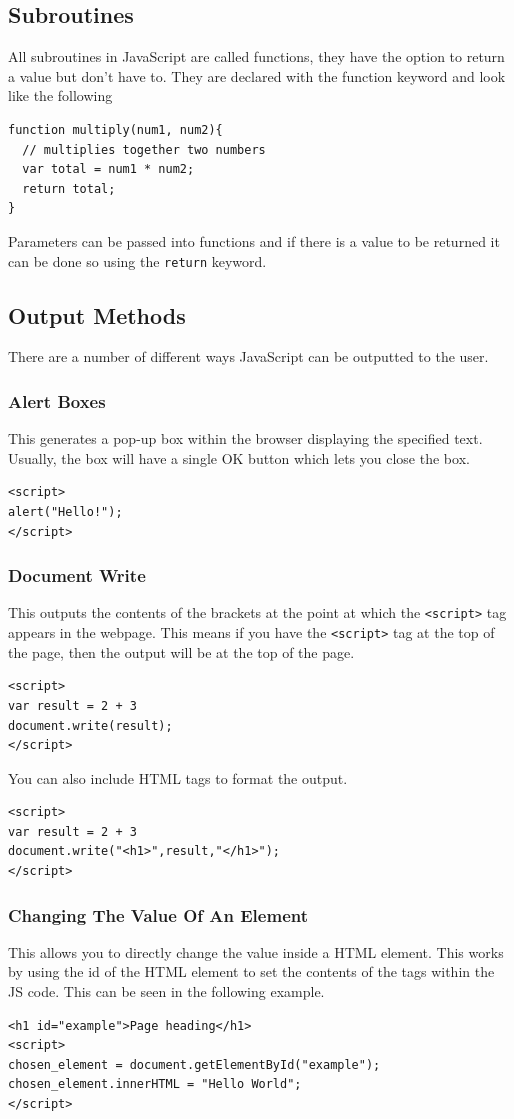 \documentclass{thomasClass}
\begin{document}
\subsection{Subroutines}
All subroutines in JavaScript are called functions, they have the option to return a value but don’t have to. 
They are declared with the function keyword and look like the following
\begin{Verbatim}[breaklines=true, breakanywhere=true]
function multiply(num1, num2){
  // multiplies together two numbers
  var total = num1 * num2;
  return total;
}
\end{Verbatim}
Parameters can be passed into functions and if there is a value to be returned it can be done so using the \verb|return| keyword.
\subsection{Output Methods}
There are a number of different ways JavaScript can be outputted to the user.
\subsubsection{Alert Boxes}
This generates a pop-up box within the browser displaying the specified text. Usually, the box will have a single OK button which lets you close the box.
\begin{Verbatim}[breaklines=true, breakanywhere=true]
<script>
alert("Hello!");
</script>
\end{Verbatim}
\subsubsection{Document Write}
This outputs the contents of the brackets at the point at which the \verb|<script>| tag appears in the webpage. This means if you have the \verb|<script>| tag at the top of the page, then the output will be at the top of the page.
\begin{Verbatim}[breaklines=true, breakanywhere=true]
<script>
var result = 2 + 3
document.write(result);
</script>
\end{Verbatim}
You can also include HTML tags to format the output.
\begin{Verbatim}[breaklines=true, breakanywhere=true]
<script>
var result = 2 + 3
document.write("<h1>",result,"</h1>");
</script>
\end{Verbatim}
\subsubsection{Changing The Value Of An Element}
This allows you  to directly change the value inside a HTML element. This works by using the id of the HTML element to set the contents of the tags within the JS code. This can be seen in the following example.
\begin{Verbatim}[breaklines=true, breakanywhere=true]
<h1 id="example">Page heading</h1>
<script>
chosen_element = document.getElementById("example");
chosen_element.innerHTML = "Hello World";
</script>
\end{Verbatim}
\end{document}
